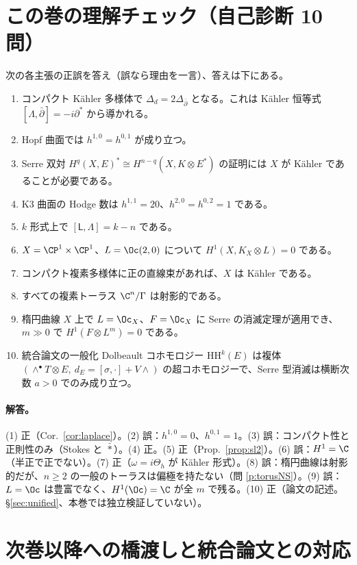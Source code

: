 
\section{この巻の理解チェック（自己診断 10 問）}\label{sec:check}
次の各主張の正誤を答え（誤なら理由を一言）、答えは下にある。
\begin{enumerate}
\item コンパクト Kähler 多様体で $\Delta_d=2\Delta_{\bar\partial}$ となる。これは Kähler 恒等式 $[\Lambda,\bar\partial]=-i\partial^*$ から導かれる。
\item Hopf 曲面では $h^{1,0}=h^{0,1}$ が成り立つ。
\item Serre 双対 $H^q(X,E)^*\cong H^{n-q}(X,K\otimes E^*)$ の証明には $X$ が Kähler であることが必要である。
\item K3 曲面の Hodge 数は $h^{1,1}=20$、$h^{2,0}=h^{0,2}=1$ である。
\item $k$ 形式上で $[\mathsf L,\Lambda]=k-n$ である。
\item $X=\CP^1\times\CP^1$、$L=\Oc(2,0)$ について $H^1(X,K_X\otimes L)=0$ である。
\item コンパクト複素多様体に正の直線束があれば、$X$ は Kähler である。
\item すべての複素トーラス $\C^n/\Gamma$ は射影的である。
\item 楕円曲線 $X$ 上で $L=\Oc_X$、$F=\Oc_X$ に Serre の消滅定理が適用でき、$m\gg0$ で $H^1(F\otimes L^m)=0$ である。
\item 統合論文の一般化 Dolbeault コホモロジー $\mathrm{HH}^k(E)$ は複体 $(\wedge^\bullet T\otimes E,\ d_E=[\sigma,\cdot]+V\wedge)$ の超コホモロジーで、Serre 型消滅は横断次数 $a>0$ でのみ成り立つ。
\end{enumerate}
\paragraph{解答。}(1) 正（Cor.\ \ref{cor:laplace}）。(2) 誤：$h^{1,0}=0$、$h^{0,1}=1$。(3) 誤：コンパクト性と正則性のみ（Stokes と $\bar\ast$）。(4) 正。(5) 正（Prop.\ \ref{prop:sl2}）。(6) 誤：$H^1=\C$（半正で正でない）。(7) 正（$\omega=i\Theta_h$ が Kähler 形式）。(8) 誤：楕円曲線は射影的だが、$n\ge2$ の一般のトーラスは偏極を持たない（問 \ref{p:torusNS}）。(9) 誤：$L=\Oc$ は豊富でなく、$H^1(\Oc)=\C$ が全 $m$ で残る。(10) 正（論文の記述。\S\ref{sec:unified}、本巻では独立検証していない\tQ）。

\section{次巻以降への橋渡しと統合論文との対応}\label{sec:bridge}
